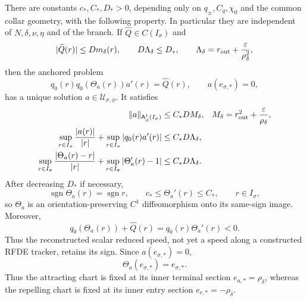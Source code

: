 \begin{lemma}
There are constants \(c_*,C_*,D_*>0\), depending only on
\(q_\pm,C_q,\chi_0\) and the common collar geometry, with the following
property.  In particular they are independent of
\(N,\delta,\nu,\eta\) and of the branch.  If
\(\widehat Q\in C(I_\sigma)\) and
\begin{equation}
 |\widehat Q(r)|\le Dm_\delta(r),\qquad
 D\Lambda_\delta\le D_*,\qquad
 \Lambda_\delta=r_{\rm out}
       +\frac{\varepsilon}{\rho_\delta^2},          \label{eq:anchored-phase-speed-class}
\end{equation}
then the anchored problem
\begin{equation}
 q_0(r)q_0(\Theta_a(r))a'(r)=\widehat Q(r),\qquad
 a(e_{\sigma,*})=0,                               \label{eq:anchored-phase-IVP}
\end{equation}
has a unique solution \(a\in\mathcal U_{\sigma,\phi}\).  It satisfies
\begin{align}
 \|a\|_{\mathsf A_\phi^1(I_\sigma)}
 &\le C_*DM_\delta,
 &M_\delta&=r_{\rm out}^2
                  +\frac{\varepsilon}{\rho_\delta},
                                                               \label{eq:anchored-phase-A1-bound}\\
 \sup_{r\in I_\sigma}\frac{|a(r)|}{|r|}
 +\sup_{r\in I_\sigma}|q_0(r)a'(r)|
 &\le C_*D\Lambda_\delta,                          \label{eq:anchored-phase-relative-bound}\\
 \sup_{r\in I_\sigma}\frac{|\Theta_a(r)-r|}{|r|}
 +\sup_{r\in I_\sigma}|\Theta_a'(r)-1|
 &\le C_*D\Lambda_\delta.                          \label{eq:anchored-phase-chart-smallness}
\end{align}
After decreasing \(D_*\) if necessary,
\begin{equation}
 \operatorname{sgn}\Theta_a(r)=\operatorname{sgn}r,\qquad
 c_*\le\Theta_a'(r)\le C_*,
 \qquad r\in I_\sigma,                             \label{eq:anchored-phase-orientation}
\end{equation}
so \(\Theta_a\) is an orientation-preserving \(C^1\) diffeomorphism onto
its same-sign image.  Moreover,
\begin{equation}
 q_0(\Theta_a(r))+\widehat Q(r)
 =q_0(r)\Theta_a'(r)<0.                            \label{eq:anchored-phase-speed-sign}
\end{equation}
Thus the reconstructed scalar reduced speed, not yet a speed along a
constructed RFDE tracker, retains its sign.
Since \(a(e_{\sigma,*})=0\),
\[
 \Theta_a(e_{\sigma,*})=e_{\sigma,*}.
\]
Thus the attracting chart is fixed at its inner terminal section
\(e_{a,*}=\rho_\delta\), whereas the repelling chart is fixed at its
inner entry section \(e_{r,*}=-\rho_\delta\).


\end{lemma}
